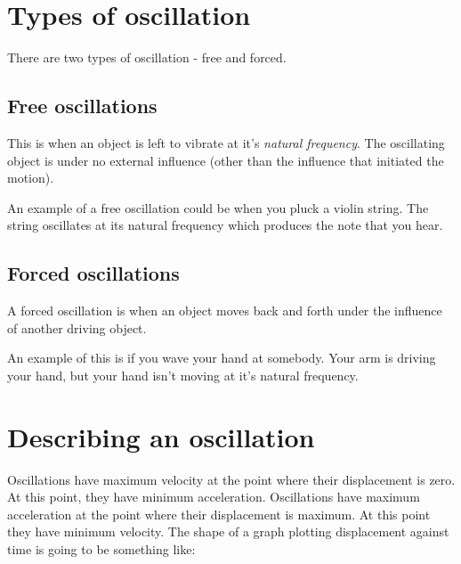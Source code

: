 \documentclass{article}
\begin{document}
\section*{Types of oscillation}
There are two types of oscillation - free and forced.
\subsection*{Free oscillations}
This is when an object is left to vibrate at it's \textit{natural frequency}.
The oscillating object is under no external influence (other than the influence
that initiated the motion). 

An example of a free oscillation could be when you pluck a violin string. The
string oscillates at its natural frequency which produces the note that you
hear.
\subsection*{Forced oscillations}
A forced oscillation is when an object moves back and forth under the influence
of another driving object.

An example of this is if you wave your hand at somebody. Your arm is driving
your hand, but your hand isn't moving at it's natural frequency.

\section*{Describing an oscillation}
Oscillations have maximum velocity at the point where their displacement is
zero. At this point, they have minimum acceleration.
Oscillations have maximum acceleration at the point where their displacement is
maximum. At this point they have minimum velocity.
The shape of a graph plotting displacement against time is going to be something
like:

\end{document}
